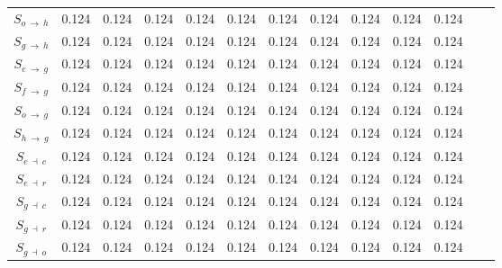\begin{ThreePartTable}
\begin{longtable}{c l *{10}{c} c}
        $S_{o \: \rightarrow \: h}$ & 0.124 &  0.124 &  0.124 &  0.124 &  0.124 &  0.124 &  0.124 &  0.124 &  0.124 &  0.124 \\
        
        $S_{g \: \rightarrow \: h}$ & 0.124 &  0.124 &  0.124 &  0.124 &  0.124 &  0.124 &  0.124 &  0.124 &  0.124 &  0.124 \\
        
        $S_{e \: \rightarrow \: g}$ & 0.124 &  0.124 &  0.124 &  0.124 &  0.124 &  0.124 &  0.124 &  0.124 &  0.124 &  0.124 \\
        
        $S_{f \: \rightarrow \: g}$ & 0.124 &  0.124 &  0.124 &  0.124 &  0.124 &  0.124 &  0.124 &  0.124 &  0.124 &  0.124 \\
        
        $S_{o \: \rightarrow \: g}$ & 0.124 &  0.124 &  0.124 &  0.124 &  0.124 &  0.124 &  0.124 &  0.124 &  0.124 &  0.124 \\
        
        $S_{h \: \rightarrow \: g}$ & 0.124 &  0.124 &  0.124 &  0.124 &  0.124 &  0.124 &  0.124 &  0.124 &  0.124 &  0.124 \\
        
        $S_{e \: \dashv \: c}$ & 0.124 &  0.124 &  0.124 &  0.124 &  0.124 &  0.124 &  0.124 &  0.124 &  0.124 &  0.124 \\
        
        $S_{e \: \dashv \: r}$ & 0.124 &  0.124 &  0.124 &  0.124 &  0.124 &  0.124 &  0.124 &  0.124 &  0.124 &  0.124 \\
        
        $S_{g \: \dashv \: c}$ & 0.124 &  0.124 &  0.124 &  0.124 &  0.124 &  0.124 &  0.124 &  0.124 &  0.124 &  0.124 \\
        
        $S_{g \: \dashv \: r}$ & 0.124 &  0.124 &  0.124 &  0.124 &  0.124 &  0.124 &  0.124 &  0.124 &  0.124 &  0.124 \\
        
        $S_{g \: \dashv \: o}$ & 0.124 &  0.124 &  0.124 &  0.124 &  0.124 &  0.124 &  0.124 &  0.124 &  0.124 &  0.124 \\
    \end{longtable}
\end{ThreePartTable}


